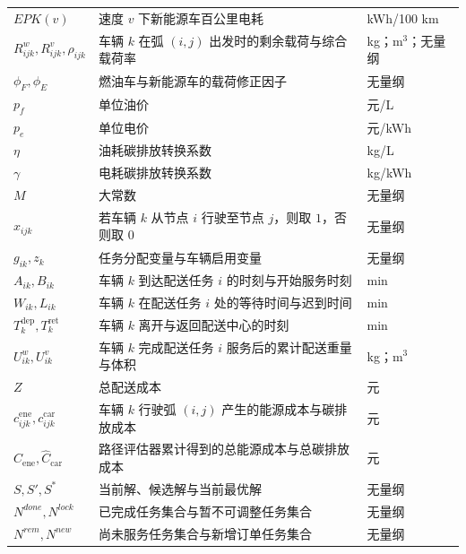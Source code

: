 \documentclass[withoutpreface,bwprint]{cumcmthesis} %
\begin{document}
\begin{xltabular}{0.95\textwidth}{>{\centering\arraybackslash}m{2.6cm}X>{\centering\arraybackslash}m{2.0cm}}
$EPK(v)$ & 速度 $v$ 下新能源车百公里电耗 & kWh/100 km \\
$R_{ijk}^w,R_{ijk}^v,\rho_{ijk}$ & 车辆 $k$ 在弧 $(i,j)$ 出发时的剩余载荷与综合载荷率 & kg；$\mathrm{m}^3$；无量纲 \\

$\phi_F,\phi_E$ & 燃油车与新能源车的载荷修正因子 & 无量纲 \\
$p_f$ & 单位油价 & 元/L \\

$p_e$ & 单位电价 & 元/kWh \\
$\eta$ & 油耗碳排放转换系数 & kg/L \\

$\gamma$ & 电耗碳排放转换系数 & kg/kWh \\
$M$ & 大常数 & 无量纲 \\

$x_{ijk}$ & 若车辆 $k$ 从节点 $i$ 行驶至节点 $j$，则取 $1$，否则取 $0$ & 无量纲 \\
$g_{ik},z_k$ & 任务分配变量与车辆启用变量 & 无量纲 \\

$A_{ik},B_{ik}$ & 车辆 $k$ 到达配送任务 $i$ 的时刻与开始服务时刻 & min \\
$W_{ik},L_{ik}$ & 车辆 $k$ 在配送任务 $i$ 处的等待时间与迟到时间 & min \\

$T_k^{\mathrm{dep}},T_k^{\mathrm{ret}}$ & 车辆 $k$ 离开与返回配送中心的时刻 & min \\
$U_{ik}^w,U_{ik}^v$ & 车辆 $k$ 完成配送任务 $i$ 服务后的累计配送重量与体积 & kg；$\mathrm{m}^3$ \\

$Z$ & 总配送成本 & 元 \\
$c_{ijk}^{\mathrm{ene}},c_{ijk}^{\mathrm{car}}$ & 车辆 $k$ 行驶弧 $(i,j)$ 产生的能源成本与碳排放成本 & 元 \\

$\widehat C_{\mathrm{ene}},\widehat C_{\mathrm{car}}$ & 路径评估器累计得到的总能源成本与总碳排放成本 & 元 \\
$S,S',S^*$ & 当前解、候选解与当前最优解 & 无量纲 \\

$N^{done},N^{lock}$ & 已完成任务集合与暂不可调整任务集合 & 无量纲 \\
$N^{rem},N^{new}$ & 尚未服务任务集合与新增订单任务集合 & 无量纲 \\


\end{xltabular}
\end{document}
